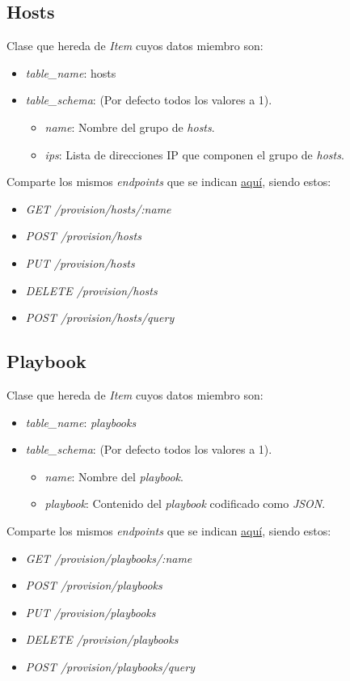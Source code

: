 \subsection{Hosts}

Clase que hereda de \textit{Item} cuyos datos miembro son:
\begin{itemize}
	\item \textit{table\_name}: hosts
	\item \textit{table\_schema}: (Por defecto todos los valores a 1).
	\begin{itemize}
		\item \textit{name}: Nombre del grupo de \textit{hosts}.
		\item \textit{ips}: Lista de direcciones IP que componen el grupo de \textit{hosts}.
	\end{itemize}
\end{itemize}
	
\bigskip
Comparte los mismos \textit{endpoints} que se indican \hyperref[sec:servicios]{aquí}, siendo estos:
\begin{itemize}
	\item \textit{GET /provision/hosts/:name}
	\item \textit{POST /provision/hosts}
	\item \textit{PUT /provision/hosts}
	\item \textit{DELETE /provision/hosts}
	\item \textit{POST /provision/hosts/query}
\end{itemize}


\subsection{Playbook}

Clase que hereda de \textit{Item} cuyos datos miembro son:
\begin{itemize}
	\item \textit{table\_name}: \textit{playbooks}
	\item \textit{table\_schema}: (Por defecto todos los valores a 1).
	\begin{itemize}
		\item \textit{name}: Nombre del \textit{playbook}.
		\item \textit{playbook}: Contenido del \textit{playbook} codificado como \textit{JSON}.
	\end{itemize}
\end{itemize}
	
\bigskip
Comparte los mismos \textit{endpoints} que se indican \hyperref[sec:servicios]{aquí}, siendo estos:
\begin{itemize}
	\item \textit{GET /provision/playbooks/:name}
	\item \textit{POST /provision/playbooks}
	\item \textit{PUT /provision/playbooks}
	\item \textit{DELETE /provision/playbooks}
	\item \textit{POST /provision/playbooks/query}
\end{itemize}

